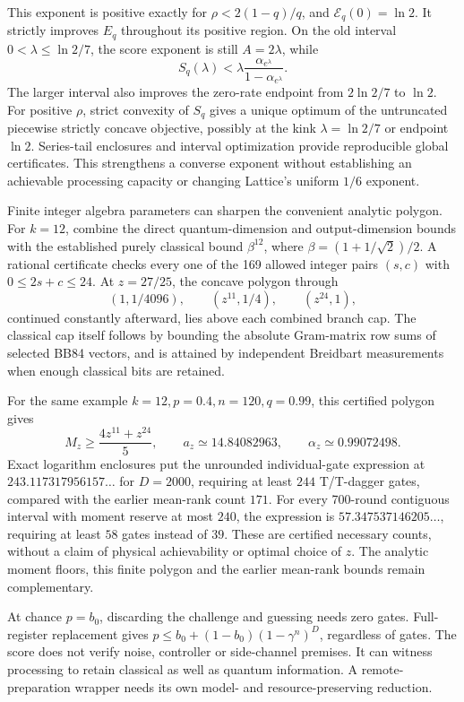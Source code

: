 \documentclass[11pt,a4paper]{article}
\numberwithin{equation}{section}
\theoremstyle{remark}\newtheorem*{remark}{Interpretation}
\begin{document}
This exponent is positive exactly for $\rho<2(1-q)/q$, and $\mathcal E_q(0)=\ln2$. It strictly improves $E_q$ throughout its positive region. On the old interval $0<\lambda\le\ln2/7$, the score exponent is still $A=2\lambda$, while
\[
S_q(\lambda)<\lambda\frac{\alpha_{e^\lambda}}{1-\alpha_{e^\lambda}}.
\]
The larger interval also improves the zero-rate endpoint from $2\ln2/7$ to $\ln2$. For positive $\rho$, strict convexity of $S_q$ gives a unique optimum of the untruncated piecewise strictly concave objective, possibly at the kink $\lambda=\ln2/7$ or endpoint $\ln2$. Series-tail enclosures and interval optimization provide reproducible global certificates. This strengthens a converse exponent without establishing an achievable processing capacity or changing Lattice's uniform $1/6$ exponent.

Finite integer algebra parameters can sharpen the convenient analytic polygon. For $k=12$, combine the direct quantum-dimension and output-dimension bounds with the established purely classical bound $\beta^{12}$, where $\beta=(1+1/\sqrt2)/2$. A rational certificate checks every one of the 169 allowed integer pairs $(s,c)$ with $0\le2s+c\le24$. At $z=27/25$, the concave polygon through
\[
(1,1/4096),\qquad(z^{11},1/4),\qquad(z^{24},1),
\]
continued constantly afterward, lies above each combined branch cap. The classical cap itself follows by bounding the absolute Gram-matrix row sums of selected BB84 vectors, and is attained by independent Breidbart measurements when enough classical bits are retained.

For the same example $k=12,p=0.4,n=120,q=0.99$, this certified polygon gives
\[
M_z\ge\frac{4z^{11}+z^{24}}5,\qquad
a_z\simeq14.84082963,\qquad \alpha_z\simeq0.99072498.
\]
Exact logarithm enclosures put the unrounded individual-gate expression at $243.117317956157\ldots$ for $D=2000$, requiring at least $244$ T/T-dagger gates, compared with the earlier mean-rank count $171$. For every 700-round contiguous interval with moment reserve at most $240$, the expression is $57.347537146205\ldots$, requiring at least $58$ gates instead of $39$. These are certified necessary counts, without a claim of physical achievability or optimal choice of $z$. The analytic moment floors, this finite polygon and the earlier mean-rank bounds remain complementary.

At chance $p=b_0$, discarding the challenge and guessing needs zero gates. Full-register replacement gives $p\le b_0+(1-b_0)(1-\gamma^n)^D$, regardless of gates. The score does not verify noise, controller or side-channel premises. It can witness processing to retain classical as well as quantum information. A remote-preparation wrapper needs its own model- and resource-preserving reduction.
\end{document}
